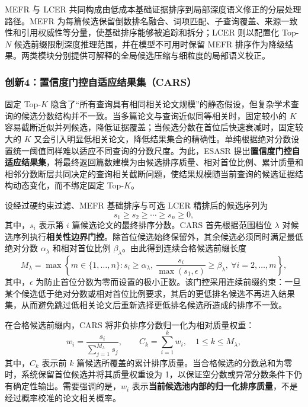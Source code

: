 \documentclass[a4paper,12pt,fontset=none]{ctexart}
\begin{document}
MEFR 与 LCER 共同构成由低成本基础证据排序到局部深度语义修正的分层处理路径。MEFR 为每篇候选保留倒数排名融合、词项匹配、子查询覆盖、来源一致性和引用权威性等分量，使基础排序能够被追踪和拆分；LCER 则以配置化 Top-$N$ 候选前缀限制深度推理范围，并在模型不可用时保留 MEFR 排序作为降级结果。两类模块分别提供可解释的全局候选压缩与细粒度的局部语义校正。

\subsubsection{创新4：置信度门控自适应结果集（CARS）}

固定 Top-$K$ 隐含了“所有查询具有相同相关论文规模”的静态假设，但复杂学术查询的候选分数结构并不一致。当多篇论文与查询近似同等相关时，固定较小的 $K$ 容易截断近似并列候选，降低证据覆盖；当候选分数在首位后快速衰减时，固定较大的 $K$ 又会引入明显低相关论文，降低结果集合的精确性。单纯根据绝对分数设置统一阈值同样难以适应不同查询的分数尺度。为此，ESASR 提出\textbf{置信度门控自适应结果集}，将最终返回篇数建模为由候选排序质量、相对首位比例、累计质量和相邻分数断层共同决定的查询相关截断问题，使结果规模随当前查询的候选证据结构动态变化，而不绑定固定 Top-$K$。

设经过硬约束过滤、MEFR 基础排序与可选 LCER 精排后的候选序列为
\begin{equation}
	s_1\geq s_2\geq\cdots\geq s_n\geq 0,
\end{equation}
其中，$s_i$ 表示第 $i$ 篇候选论文的最终排序分数。CARS 首先根据范围档位 $\lambda$ 对候选序列执行\textbf{相关性边界门控}。除首位候选始终保留外，其余候选必须同时满足最低绝对分数 $\alpha_\lambda$ 和相对首位比例 $\beta_\lambda$。由此得到连续合格候选前缀长度
\begin{equation}
	M_\lambda
	=
	\max\left\{
	m\in\{1,\ldots,n\}:
	s_i\geq\alpha_\lambda,\ 
	\frac{s_i}{\max(s_1,\epsilon)}\geq\beta_\lambda,\ 
	\forall i=2,\ldots,m
	\right\},
	\label{eq:cars-eligible}
\end{equation}
其中，$\epsilon$ 为防止首位分数为零而设置的极小正数。该门控采用连续前缀约束：一旦某个候选低于绝对分数或相对首位比例要求，其后的更低排名候选不再进入结果集，从而避免跳过低相关论文后重新选择更低排名候选所造成的排序不一致。

在合格候选前缀内，CARS 将非负排序分数归一化为相对质量权重：
\begin{equation}
	w_i
	=
	\frac{s_i}{\sum_{j=1}^{M_\lambda}s_j},
	\qquad
	C_k
	=
	\sum_{i=1}^{k}w_i,
	\quad
	1\leq k\leq M_\lambda,
	\label{eq:cars-mass}
\end{equation}
其中，$C_k$ 表示前 $k$ 篇候选所覆盖的累计排序质量。当合格候选的分数总和为零时，系统保留首位候选并将其质量权重设为 1，以保证空分数或异常分数条件下仍有确定性输出。需要强调的是，$w_i$ 表示\textbf{当前候选池内部的归一化排序质量}，不是经过概率校准的论文相关概率。
\end{document}
